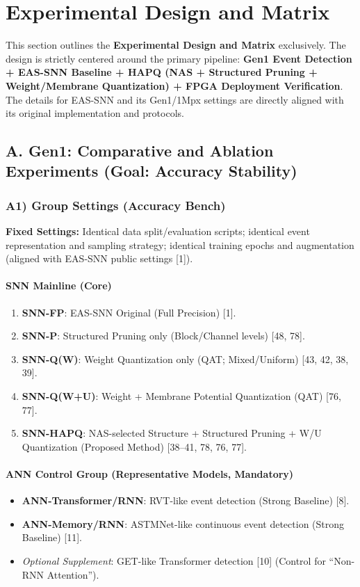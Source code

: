 \documentclass[10pt,a4paper]{article}
\begin{document}
\section{Experimental Design and Matrix}

This section outlines the \textbf{Experimental Design and Matrix} exclusively. The design is strictly centered around the primary pipeline: \textbf{Gen1 Event Detection + EAS-SNN Baseline + HAPQ (NAS + Structured Pruning + Weight/Membrane Quantization) + FPGA Deployment Verification}. The details for EAS-SNN and its Gen1/1Mpx settings are directly aligned with its original implementation and protocols.

\subsection{A. Gen1: Comparative and Ablation Experiments (Goal: Accuracy Stability)}

\subsubsection{A1) Group Settings (Accuracy Bench)}

\textbf{Fixed Settings:} Identical data split/evaluation scripts; identical event representation and sampling strategy; identical training epochs and augmentation (aligned with EAS-SNN public settings [1]).

\paragraph{SNN Mainline (Core)}
\begin{enumerate}
    \item \textbf{SNN-FP}: EAS-SNN Original (Full Precision) [1].
    \item \textbf{SNN-P}: Structured Pruning only (Block/Channel levels) [48, 78].
    \item \textbf{SNN-Q(W)}: Weight Quantization only (QAT; Mixed/Uniform) [43, 42, 38, 39].
    \item \textbf{SNN-Q(W+U)}: Weight + Membrane Potential Quantization (QAT) [76, 77].
    \item \textbf{SNN-HAPQ}: NAS-selected Structure + Structured Pruning + W/U Quantization (Proposed Method) [38--41, 78, 76, 77].
\end{enumerate}

\paragraph{ANN Control Group (Representative Models, Mandatory)}
\begin{itemize}
    \item \textbf{ANN-Transformer/RNN}: RVT-like event detection (Strong Baseline) [8].
    \item \textbf{ANN-Memory/RNN}: ASTMNet-like continuous event detection (Strong Baseline) [11].
    \item \textit{Optional Supplement}: GET-like Transformer detection [10] (Control for ``Non-RNN Attention'').
\end{itemize}
\end{document}
